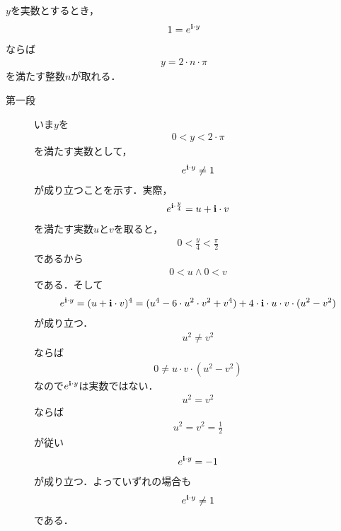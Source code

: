 	\begin{screen}
		\begin{thm}[$1 = e^{\isym \cdot y}$を満たす実数$y$は$2 \cdot \pi$の整数倍に限られる]
			$y$を実数とするとき，
			\begin{align}
				1 = e^{\mathbf{i} \cdot y}
			\end{align}
			ならば
			\begin{align}
				y = 2 \cdot n \cdot \pi
			\end{align}
			を満たす整数$n$が取れる．
		\end{thm}
	\end{screen}
	
	\begin{sketch}\mbox{}
		\begin{description}
			\item[第一段]
				いま$y$を
				\begin{align}
					0 < y < 2 \cdot \pi
				\end{align}
				を満たす実数として，
				\begin{align}
					e^{\mathbf{i} \cdot y} \neq 1
				\end{align}
				が成り立つことを示す．実際，
				\begin{align}
					e^{\mathbf{i} \cdot \frac{y}{4}} = u + \mathbf{i} \cdot v
				\end{align}
				を満たす実数$u$と$v$を取ると，
				\begin{align}
					0 < \frac{y}{4} < \frac{\pi}{2}
				\end{align}
				であるから
				\begin{align}
					0 < u \wedge 0 < v
				\end{align}
				である．そして
				\begin{align}
					e^{\mathbf{i} \cdot y} = (u + \mathbf{i} \cdot v)^4
					= (u^4 - 6 \cdot u^2 \cdot v^2 + v^4) 
					+ 4 \cdot \mathbf{i} \cdot u \cdot v \cdot (u^2 - v^2)
				\end{align}
				が成り立つ．
				\begin{align}
					u^2 \neq v^2
				\end{align}
				ならば
				\begin{align}
					0 \neq u \cdot v \cdot (u^2 - v^2)
				\end{align}
				なので$e^{\mathbf{i} \cdot y}$は実数ではない．
				\begin{align}
					u^2 = v^2
				\end{align}
				ならば
				\begin{align}
					u^2 = v^2 = \frac{1}{2}
				\end{align}
				が従い
				\begin{align}
					e^{\mathbf{i} \cdot y} = -1
				\end{align}
				が成り立つ．よっていずれの場合も
				\begin{align}
					e^{\mathbf{i} \cdot y} \neq 1
				\end{align}
				である．
				

\end{description}
\end{sketch}
